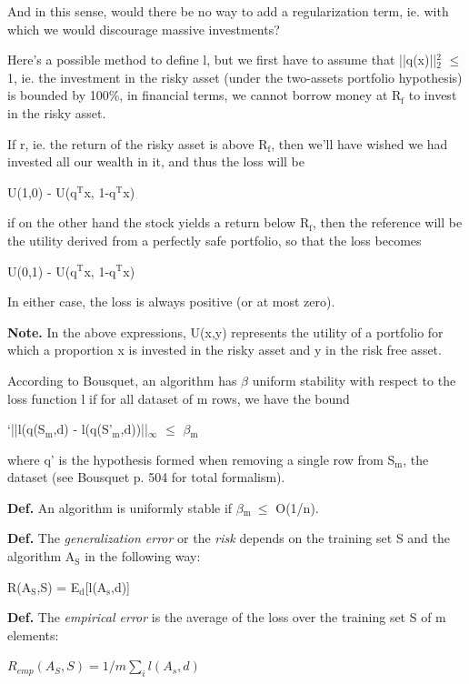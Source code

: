 \documentclass[11pt]{article}
\begin{document}
And in this sense, would there be no way to add a regularization term, ie. with which we
would discourage massive investments?

Here's a possible method to define l, but we first have to assume that ||q(x)||$_{\text{2}}^{\text{2}}$ $\le$ 1,
ie. the investment in the risky asset (under the two-assets portfolio hypothesis) is
bounded by 100\%, in financial terms, we cannot borrow money at R$_{\text{f}}$ to invest in the risky
asset. 

If r, ie. the return of the risky asset is above R$_{\text{f}}$, then we'll have wished we had
invested all our wealth in it, and thus the loss will be 

U(1,0) - U(q$^{\text{T}}$x, 1-q$^{\text{T}}$x)

if on the other hand the stock yields a return below R$_{\text{f}}$, then the reference will be the
utility derived from a perfectly safe portfolio, so that the loss becomes

U(0,1) - U(q$^{\text{T}}$x, 1-q$^{\text{T}}$x)

In either case, the loss is always positive (or at most zero).

\textbf{Note.} In the above expressions, U(x,y) represents the utility of a portfolio for which a
 proportion x is invested in the risky asset and y in the risk free asset.

According to Bousquet, an algorithm has $\beta$ uniform stability with respect to the loss
function l if for all dataset of m rows, we have the bound

`||l(q(S$_{\text{m}}$,d) - l(q(S'$_{\text{m}}$,d))||$_{\infty}$ $\le$ $\beta$$_{\text{m}}$

where q' is the hypothesis formed when removing a single row from S$_{\text{m}}$, the dataset (see
Bousquet p. 504 for total formalism). 

\textbf{Def.} An algorithm is uniformly stable if $\beta$$_{\text{m }}$$\le$ O(1/n).

\textbf{Def.} The \emph{generalization error} or the \emph{risk} depends on the training set S and the algorithm
 A$_{\text{S}}$ in the following way:

R(A$_{\text{S}}$,S) = E$_{\text{d}}$[l(A$_{\text{s}}$,d)]

\textbf{Def.} The \emph{empirical error} is the average of the loss over the training set S of m
elements:

$R_{emp}(A_S,S) = 1/m \sum_i l(A_s, d)$
\end{document}
